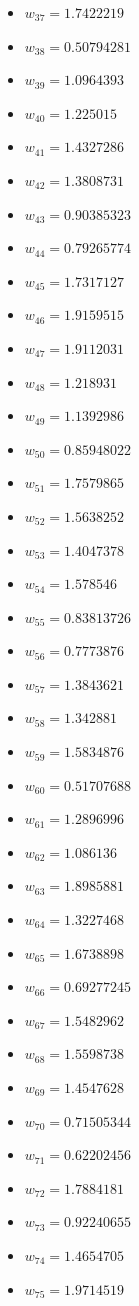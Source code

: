 \documentclass[11pt]{article}
\begin{document}
\begin{itemize}
\item $w_{37} = 1.7422219$
\item $w_{38} = 0.50794281$
\item $w_{39} = 1.0964393$
\item $w_{40} = 1.225015$
\item $w_{41} = 1.4327286$
\item $w_{42} = 1.3808731$
\item $w_{43} = 0.90385323$
\item $w_{44} = 0.79265774$
\item $w_{45} = 1.7317127$
\item $w_{46} = 1.9159515$
\item $w_{47} = 1.9112031$
\item $w_{48} = 1.218931$
\item $w_{49} = 1.1392986$
\item $w_{50} = 0.85948022$
\item $w_{51} = 1.7579865$
\item $w_{52} = 1.5638252$
\item $w_{53} = 1.4047378$
\item $w_{54} = 1.578546$
\item $w_{55} = 0.83813726$
\item $w_{56} = 0.7773876$
\item $w_{57} = 1.3843621$
\item $w_{58} = 1.342881$
\item $w_{59} = 1.5834876$
\item $w_{60} = 0.51707688$
\item $w_{61} = 1.2896996$
\item $w_{62} = 1.086136$
\item $w_{63} = 1.8985881$
\item $w_{64} = 1.3227468$
\item $w_{65} = 1.6738898$
\item $w_{66} = 0.69277245$
\item $w_{67} = 1.5482962$
\item $w_{68} = 1.5598738$
\item $w_{69} = 1.4547628$
\item $w_{70} = 0.71505344$
\item $w_{71} = 0.62202456$
\item $w_{72} = 1.7884181$
\item $w_{73} = 0.92240655$
\item $w_{74} = 1.4654705$
\item $w_{75} = 1.9714519$

\end{itemize}
\end{document}
